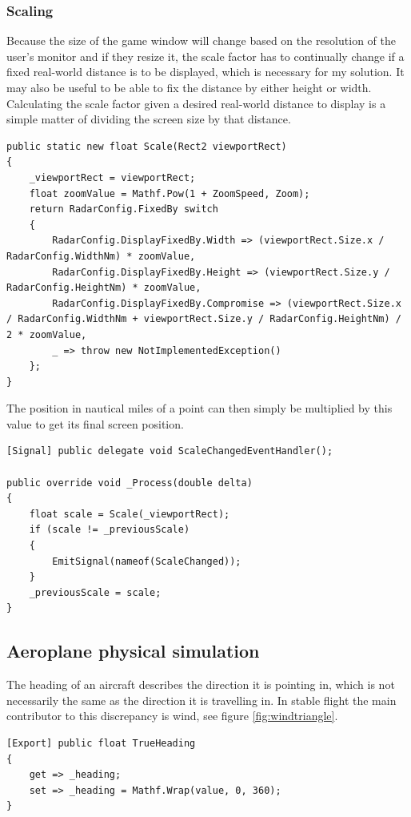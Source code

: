 \documentclass{article}
\begin{document}
\subsubsection{Scaling}
Because the size of the game window will change based on the resolution of the user's monitor and if they resize it, the scale factor has to continually change if a fixed real-world distance is to be displayed, which is necessary for my solution.
It may also be useful to be able to fix the distance by either height or width.
Calculating the scale factor given a desired real-world distance to display is a simple matter of dividing the screen size by that distance.
\lstset{style=csharp}
\begin{lstlisting}[caption=Calculating the scale]
public static new float Scale(Rect2 viewportRect)
{
    _viewportRect = viewportRect;
    float zoomValue = Mathf.Pow(1 + ZoomSpeed, Zoom);
    return RadarConfig.FixedBy switch
    {
        RadarConfig.DisplayFixedBy.Width => (viewportRect.Size.x / RadarConfig.WidthNm) * zoomValue,
        RadarConfig.DisplayFixedBy.Height => (viewportRect.Size.y / RadarConfig.HeightNm) * zoomValue,
        RadarConfig.DisplayFixedBy.Compromise => (viewportRect.Size.x / RadarConfig.WidthNm + viewportRect.Size.y / RadarConfig.HeightNm) / 2 * zoomValue,
        _ => throw new NotImplementedException()
    };
}
\end{lstlisting}
The position in nautical miles of a point can then simply be multiplied by this value to get its final screen position.
\begin{lstlisting}[caption=Notifying other modules of a change in scale]
[Signal] public delegate void ScaleChangedEventHandler();

public override void _Process(double delta)
{
    float scale = Scale(_viewportRect);
    if (scale != _previousScale)
    {
        EmitSignal(nameof(ScaleChanged));
    }
    _previousScale = scale;
}
\end{lstlisting}


\subsection{Aeroplane physical simulation}
The heading of an aircraft describes the direction it is pointing in, which is not necessarily the same as the direction it is travelling in.
In stable flight the main contributor to this discrepancy is wind, see figure \ref{fig:windtriangle}.

\lstset{style=csharp}
\begin{lstlisting}[caption=Wrapping true heading value]
[Export] public float TrueHeading
{
    get => _heading;
    set => _heading = Mathf.Wrap(value, 0, 360);
}
\end{lstlisting}
\end{document}

